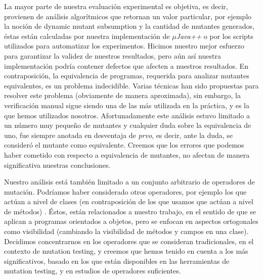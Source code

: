 La mayor parte de nuestra evaluaci\'on experimental es objetiva, es decir, provienen de an\'alisis algor\'itmicos  que retornan un valor particular, por ejemplo la noci\'on de dynamic mutant subsumption y la cantidad de mutantes generados, \'estas est\'an calculadas por nuestra implementaci\'on de \emph{$\mu$Java++} o por los scripts utilizados para automatizar los experimentos. Hicimos nuestro mejor esfuerzo para garantizar la validez de nuestros resultados, pero a\'un as\'i nuestra implementaci\'on podr\'ia contener defectos que afecten a nuestros resultados. En contraposici\'on, la equivalencia de programas, requerida para analizar mutantes equivalentes, es un problema indecidible. Varias t\'ecnicas han sido propuestas para resolver este problema (obviamente de manera aproximada), sin embargo, la verificaci\'on manual sigue siendo una de las m\'as utilizada en la pr\'actica, y es la que hemos utilizados nosotros. Afortunadamente este an\'alisis estuvo limitado a un n\'umero muy peque\~no de mutantes y cualquier duda sobre la equivalencia de uno, fue siempre anotada en desventaja de \emph{prvo}, es decir, ante la duda, se consider\'o el mutante como equivalente. Creemos que los errores que podemos haber cometido con respecto a equivalencia de mutantes, no afectan de manera significativa nuestras conclusiones.

Nuestro an\'alisis est\'a tambi\'en limitado a un conjunto arbitrario de operadores de mutaci\'on. Podr\'iamos haber considerado otros operadores, por ejemplo los que act\'uan a nivel de clases (en contraposici\'on de los que usamos que act\'uan a nivel de m\'etodos) \cite{bibliography.mutation.class-level-ops}. \'Estos, est\'an relacionados a nuestro trabajo, en el sentido de que se aplican a programas orientados a objetos, pero se enfocan en aspectos ortogonales como visibilidad (cambiando la visibilidad de m\'etodos y campos en una clase). Decidimos concentrarnos en los operadores que se consideran tradicionales, en el contexto de mutation testing, y creemos que hemos tenido en cuenta a los m\'as significativos, basado en los que est\'an disponibles en las herramientas de mutation testing, y en estudios de operadores suficientes.


